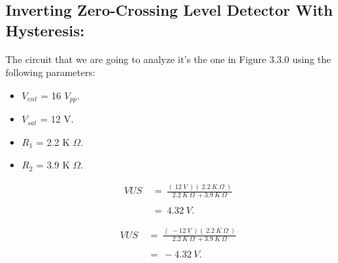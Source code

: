 \subsection{Inverting Zero-Crossing Level Detector With Hysteresis:}

The circuit that we are going to analyze it's the one in Figure 3.3.0 using the following parameters: \hfill \break

{\bfseries
\begin{itemize}
\item $V_{ent}$ = 16 $V_{pp}$.
\item $V_{sat}$ = 12 V.
\item $R_{1}$ = 2.2 K $\Omega$.
\item $R_{2}$ = 3.9 K $\Omega$.
\end{itemize}} \hfill

{\bfseries\itshape\color{Violet}{
\begin{itemize}
\item For VUS:
\end{itemize}}} 

\begin{flushright}
{\bfseries\itshape{}} \hfill \break
\end{flushright}

\begin{ceqn}
\begin{align*}
VUS\ &=\ \frac{(\ 12\ V\ )(\ 2.2\ K\ \Omega\ )}{2.2\ K\ \Omega\ + 3.9\ K\ \Omega} \\ \\
&=\ 4.32\ V.
\end{align*}
\end{ceqn} \hfill \break

{\bfseries\itshape\color{Violet}{
\begin{itemize}
\item For VUI:
\end{itemize}}} 

\begin{flushright}
{\bfseries\itshape{}} \hfill \break
\end{flushright}

\begin{ceqn}
\begin{align*}
VUS\ &=\ \frac{(\ -12\ V\ )(\ 2.2\ K\ \Omega\ )}{2.2\ K\ \Omega\ + 3.9\ K\ \Omega} \\ \\
&=\ -4.32\ V.
\end{align*}
\end{ceqn} \hfill \break

